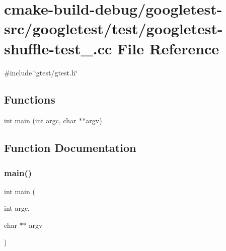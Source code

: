 \hypertarget{googletest-shuffle-test___8cc}{}\section{cmake-\/build-\/debug/googletest-\/src/googletest/test/googletest-\/shuffle-\/test\+\_\+.cc File Reference}
\label{googletest-shuffle-test___8cc}
{\ttfamily \#include \char`\"{}gtest/gtest.\+h\char`\"{}}\newline
\subsection*{Functions}
\begin{DoxyCompactItemize}
\item 
int \mbox{\hyperlink{googletest-shuffle-test___8cc_a3c04138a5bfe5d72780bb7e82a18e627}{main}} (int argc, char $\ast$$\ast$argv)
\end{DoxyCompactItemize}


\subsection{Function Documentation}
\mbox{\label{googletest-shuffle-test___8cc_a3c04138a5bfe5d72780bb7e82a18e627}} 
\subsubsection{\texorpdfstring{main()}{main()}}
{\footnotesize\ttfamily int main (\begin{DoxyParamCaption}\item[{int}]{argc,  }\item[{char $\ast$$\ast$}]{argv }\end{DoxyParamCaption})}


